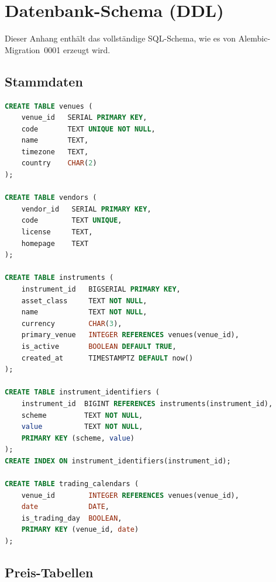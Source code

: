 
\chapter{Datenbank-Schema (DDL)}

\label{app:schema}

Dieser Anhang enthält das vollständige SQL-Schema, wie es von
Alembic-Migration~0001 erzeugt wird.

\section{Stammdaten}

\begin{lstlisting}[language=sql, caption={Stammdaten-Tabellen},label=lst:ddl-stamm]
CREATE TABLE venues (
    venue_id   SERIAL PRIMARY KEY,
    code       TEXT UNIQUE NOT NULL,
    name       TEXT,
    timezone   TEXT,
    country    CHAR(2)
);

CREATE TABLE vendors (
    vendor_id   SERIAL PRIMARY KEY,
    code        TEXT UNIQUE,
    license     TEXT,
    homepage    TEXT
);

CREATE TABLE instruments (
    instrument_id   BIGSERIAL PRIMARY KEY,
    asset_class     TEXT NOT NULL,
    name            TEXT NOT NULL,
    currency        CHAR(3),
    primary_venue   INTEGER REFERENCES venues(venue_id),
    is_active       BOOLEAN DEFAULT TRUE,
    created_at      TIMESTAMPTZ DEFAULT now()
);

CREATE TABLE instrument_identifiers (
    instrument_id  BIGINT REFERENCES instruments(instrument_id),
    scheme         TEXT NOT NULL,
    value          TEXT NOT NULL,
    PRIMARY KEY (scheme, value)
);
CREATE INDEX ON instrument_identifiers(instrument_id);

CREATE TABLE trading_calendars (
    venue_id        INTEGER REFERENCES venues(venue_id),
    date            DATE,
    is_trading_day  BOOLEAN,
    PRIMARY KEY (venue_id, date)
);
\end{lstlisting}

\section{Preis-Tabellen}

